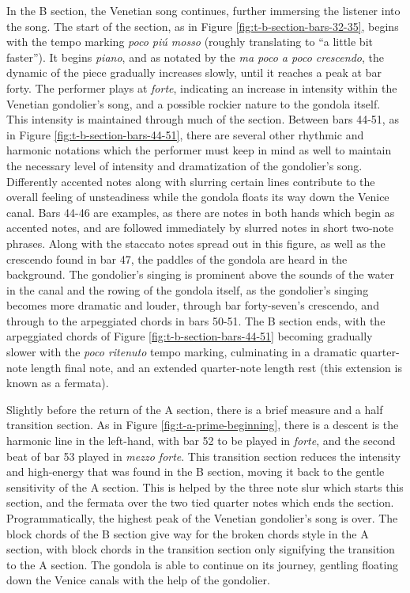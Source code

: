 In the B section, the Venetian song continues, further immersing the listener into the song. The start of the section, as in Figure \ref{fig:t-b-section-bars-32-35}\autocite{Henle_2002}, begins with the tempo marking \textit{poco piú mosso} (roughly translating to ``a little bit faster''). It begins \textit{piano}, and as notated by the \textit{ma poco a poco crescendo}, the dynamic of the piece gradually increases slowly, until it reaches a peak at bar forty. The performer plays at \textit{forte}, indicating an increase in intensity within the Venetian gondolier's song, and a possible rockier nature to the gondola itself. This intensity is maintained through much of the section. Between bars 44-51, as in Figure \ref{fig:t-b-section-bars-44-51}\autocite{Henle_2002}, there are several other rhythmic and harmonic notations which the performer must keep in mind as well to maintain the necessary level of intensity and dramatization of the gondolier's song. Differently accented notes along with slurring certain lines contribute to the overall feeling of unsteadiness while the gondola floats its way down the Venice canal. Bars 44-46 are examples, as there are notes in both hands which begin as accented notes, and are followed immediately by slurred notes in short two-note phrases. Along with the staccato notes spread out in this figure, as well as the crescendo found in bar 47, the paddles of the gondola are heard in the background. The gondolier's singing is prominent above the sounds of the water in the canal and the rowing of the gondola itself, as the gondolier's singing becomes more dramatic and louder, through bar forty-seven's crescendo, and through to the arpeggiated chords in bars 50-51. The B section ends, with the arpeggiated chords of Figure \ref{fig:t-b-section-bars-44-51}\autocite{Henle_2002} becoming gradually slower with the \textit{poco ritenuto} tempo marking, culminating in a dramatic quarter-note length final note, and an extended quarter-note length rest (this extension is known as a fermata).

Slightly before the return of the A section, there is a brief measure and a half transition section. As in Figure \ref{fig:t-a-prime-beginning}\autocite{Henle_2002}, there is a descent is the harmonic line in the left-hand, with bar 52 to be played in \textit{forte}, and the second beat of bar 53 played in \textit{mezzo forte}. This transition section reduces the intensity and high-energy that was found in the B section, moving it back to the gentle sensitivity of the A section. This is helped by the three note slur which starts this section, and the fermata over the two tied quarter notes which ends the section. Programmatically, the highest peak of the Venetian gondolier's song is over. The block chords of the B section give way for the broken chords style in the A section, with block chords in the transition section only signifying the transition to the A section. The gondola is able to continue on its journey, gentling floating down the Venice canals with the help of the gondolier.


